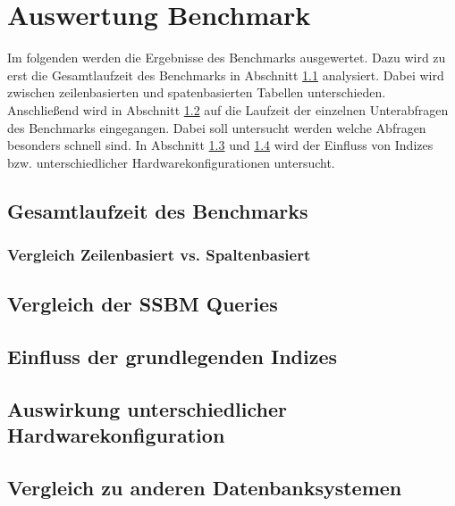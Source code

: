 \chapter{Auswertung Benchmark}
Im folgenden werden die Ergebnisse des Benchmarks ausgewertet.
Dazu wird zu erst die Gesamtlaufzeit des Benchmarks in Abschnitt \ref{auswertung:generell} analysiert. Dabei wird zwischen zeilenbasierten und spatenbasierten
Tabellen unterschieden.
Anschließend wird in Abschnitt \ref{auswertung:queries} auf die Laufzeit der
einzelnen Unterabfragen des Benchmarks eingegangen.
Dabei soll untersucht werden welche Abfragen besonders schnell sind.
In Abschnitt \ref{auswertung:basic_indizes} und \ref{auswertung:hardware}
wird der Einfluss von Indizes bzw. unterschiedlicher Hardwarekonfigurationen
untersucht.

\section{Gesamtlaufzeit des Benchmarks}\label{auswertung:generell}


\subsection{Vergleich Zeilenbasiert vs. Spaltenbasiert}\label{auswertung:row_vs_col}

\section{Vergleich der SSBM Queries}\label{auswertung:queries}



\section{Einfluss der grundlegenden Indizes}\label{auswertung:basic_indizes}


\section{Auswirkung unterschiedlicher Hardwarekonfiguration}\label{auswertung:hardware}


\section{Vergleich zu anderen Datenbanksystemen}\label{auswertung:vergleich}


